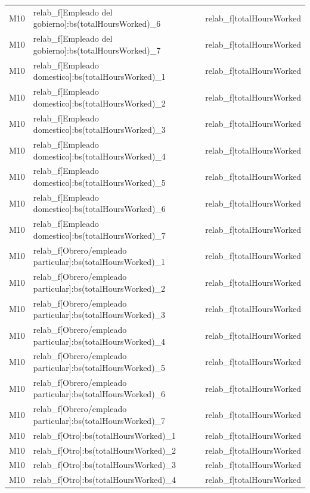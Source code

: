 \begin{longtable}{lll}
M10 & relab\_f[Empleado del gobierno]:bs(totalHoursWorked)\_6 & relab\_f|totalHoursWorked \\
M10 & relab\_f[Empleado del gobierno]:bs(totalHoursWorked)\_7 & relab\_f|totalHoursWorked \\
M10 & relab\_f[Empleado domestico]:bs(totalHoursWorked)\_1 & relab\_f|totalHoursWorked \\
M10 & relab\_f[Empleado domestico]:bs(totalHoursWorked)\_2 & relab\_f|totalHoursWorked \\
M10 & relab\_f[Empleado domestico]:bs(totalHoursWorked)\_3 & relab\_f|totalHoursWorked \\
M10 & relab\_f[Empleado domestico]:bs(totalHoursWorked)\_4 & relab\_f|totalHoursWorked \\
M10 & relab\_f[Empleado domestico]:bs(totalHoursWorked)\_5 & relab\_f|totalHoursWorked \\
M10 & relab\_f[Empleado domestico]:bs(totalHoursWorked)\_6 & relab\_f|totalHoursWorked \\
M10 & relab\_f[Empleado domestico]:bs(totalHoursWorked)\_7 & relab\_f|totalHoursWorked \\
M10 & relab\_f[Obrero/empleado particular]:bs(totalHoursWorked)\_1 & relab\_f|totalHoursWorked \\
M10 & relab\_f[Obrero/empleado particular]:bs(totalHoursWorked)\_2 & relab\_f|totalHoursWorked \\
M10 & relab\_f[Obrero/empleado particular]:bs(totalHoursWorked)\_3 & relab\_f|totalHoursWorked \\
M10 & relab\_f[Obrero/empleado particular]:bs(totalHoursWorked)\_4 & relab\_f|totalHoursWorked \\
M10 & relab\_f[Obrero/empleado particular]:bs(totalHoursWorked)\_5 & relab\_f|totalHoursWorked \\
M10 & relab\_f[Obrero/empleado particular]:bs(totalHoursWorked)\_6 & relab\_f|totalHoursWorked \\
M10 & relab\_f[Obrero/empleado particular]:bs(totalHoursWorked)\_7 & relab\_f|totalHoursWorked \\
M10 & relab\_f[Otro]:bs(totalHoursWorked)\_1 & relab\_f|totalHoursWorked \\
M10 & relab\_f[Otro]:bs(totalHoursWorked)\_2 & relab\_f|totalHoursWorked \\
M10 & relab\_f[Otro]:bs(totalHoursWorked)\_3 & relab\_f|totalHoursWorked \\
M10 & relab\_f[Otro]:bs(totalHoursWorked)\_4 & relab\_f|totalHoursWorked \\

\end{longtable}
